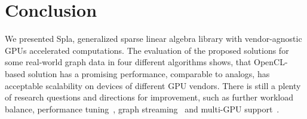 \section{Conclusion}

We presented Spla, generalized sparse linear algebra library with vendor-agnostic GPUs accelerated computations. The evaluation of the proposed solutions for some real-world graph data in four different algorithms shows, that OpenCL-based solution has a promising performance, comparable to analogs, has acceptable scalability on devices of different GPU vendors. There is still a plenty of research questions and directions for improvement, such as further workload balance, performance tuning~\cite{8025284/spgemm/nagasaka}, graph streaming~\cite{10.1145/2600212.2600227} and multi-GPU support~\cite{7967137}.